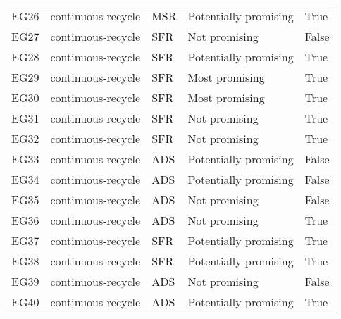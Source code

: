 \begin{tabular}{lllll}
EG26 & continuous-recycle & MSR & Potentially promising & True \\
EG27 & continuous-recycle & SFR & Not promising & False \\
EG28 & continuous-recycle & SFR & Potentially promising & True \\
EG29 & continuous-recycle & SFR & Most promising & True \\
EG30 & continuous-recycle & SFR & Most promising & True \\
EG31 & continuous-recycle & SFR & Not promising & True \\
EG32 & continuous-recycle & SFR & Not promising & True \\
EG33 & continuous-recycle & ADS & Potentially promising & False \\
EG34 & continuous-recycle & ADS & Potentially promising & False \\
EG35 & continuous-recycle & ADS & Not promising & False \\
EG36 & continuous-recycle & ADS & Not promising & True \\
EG37 & continuous-recycle & SFR & Potentially promising & True \\
EG38 & continuous-recycle & SFR & Potentially promising & True \\
EG39 & continuous-recycle & ADS & Not promising & False \\
EG40 & continuous-recycle & ADS & Potentially promising & True \\
\bottomrule
\end{tabular}
